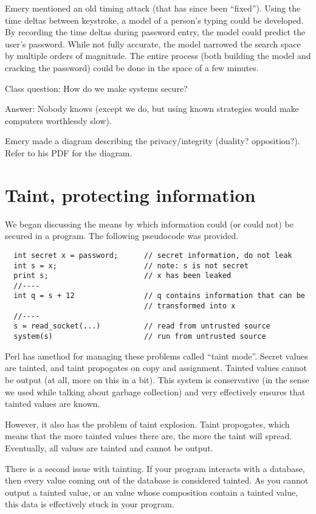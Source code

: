 \documentclass[twoside]{article}
\begin{document}
Emery mentioned an old timing attack (that has since been ``fixed''). Using the time deltas between keystroke, a model of a person's typing could be developed. By recording the time deltas during password entry, the model could predict the user's password. While not fully accurate, the model narrowed the search space by multiple orders of magnitude. The entire process (both building the model and cracking the password) could be done in the space of a few minutes.

Class question: How do we make systems secure?

Answer: Nobody knows (except we do, but using known strategies would make computers worthlessly slow).

Emery made a diagram describing the privacy/integrity (duality? opposition?). Refer to his PDF for the diagram.

\section{Taint, protecting information}

We began discussing the means by which information could (or could not) be secured in a program. The following pseudocode was provided.

\begin{lstlisting}
  int secret x = password;      // secret information, do not leak
  int s = x;                    // note: s is not secret
  print s;                      // x has been leaked
  //----
  int q = s + 12                // q contains information that can be
                                // transformed into x
  //----
  s = read_socket(...)          // read from untrusted source
  system(s)                     // run from untrusted source
\end{lstlisting}

Perl has amethod for managing these problems called ``taint mode''. Secret values are tainted, and taint propogates on copy and assignment. Tainted values cannot be output (at all, more on this in a bit). This system is conservative (in the sense we used while talking about garbage collection) and very effectively ensures that tainted values are known.

However, it also has the problem of taint explosion. Taint propogates, which means that the more tainted values there are, the more the taint will spread. Eventually, all values are tainted and cannot be output.

There is a second issue with tainting. If your program interacts with a database, then every value coming out of the database is considered tainted. As you cannot output a tainted value, or an value whose composition contain a tainted value, this data is effectively stuck in your program.
\end{document}
